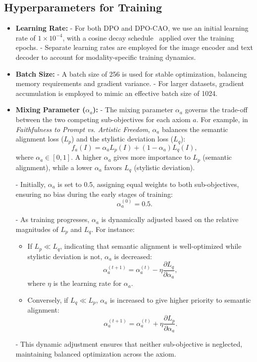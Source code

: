 \subsection{Hyperparameters for Training}
\begin{itemize}
    \item \textbf{Learning Rate:}  
    - For both DPO and DPO-CAO, we use an initial learning rate of \(1 \times 10^{-4}\), with a cosine decay schedule~\cite{loshchilov2016sgdr} applied over the training epochs.  
    - Separate learning rates are employed for the image encoder and text decoder to account for modality-specific training dynamics.  

    \item \textbf{Batch Size:}  
    - A batch size of 256 is used for stable optimization, balancing memory requirements and gradient variance.  
    - For larger datasets, gradient accumulation is employed to mimic an effective batch size of 1024.  

    \item \textbf{Mixing Parameter (\(\alpha_a\)):}  
    - The mixing parameter \(\alpha_a\) governs the trade-off between the two competing sub-objectives for each axiom \(a\). For example, in \textit{Faithfulness to Prompt vs. Artistic Freedom}, \(\alpha_a\) balances the semantic alignment loss (\(L_p\)) and the stylistic deviation loss (\(L_q\)):
    \[
    f_a(I) = \alpha_a L_p(I) + (1 - \alpha_a) L_q(I),
    \]
    where \(\alpha_a \in [0, 1]\). A higher \(\alpha_a\) gives more importance to \(L_p\) (semantic alignment), while a lower \(\alpha_a\) favors \(L_q\) (stylistic deviation).

    - Initially, \(\alpha_a\) is set to 0.5, assigning equal weights to both sub-objectives, ensuring no bias during the early stages of training:
    \[
    \alpha_a^{(0)} = 0.5.
    \]

    - As training progresses, \(\alpha_a\) is dynamically adjusted based on the relative magnitudes of \(L_p\) and \(L_q\). For instance:
        \begin{itemize}
            \item If \(L_p \ll L_q\), indicating that semantic alignment is well-optimized while stylistic deviation is not, \(\alpha_a\) is decreased:
            \[
            \alpha_a^{(t+1)} = \alpha_a^{(t)} - \eta \frac{\partial L_q}{\partial \alpha_a},
            \]
            where \(\eta\) is the learning rate for \(\alpha_a\).  
            \item Conversely, if \(L_q \ll L_p\), \(\alpha_a\) is increased to give higher priority to semantic alignment:
            \[
            \alpha_a^{(t+1)} = \alpha_a^{(t)} + \eta \frac{\partial L_p}{\partial \alpha_a}.
            \]
        \end{itemize}
    - This dynamic adjustment ensures that neither sub-objective is neglected, maintaining balanced optimization across the axiom.


\end{itemize}
